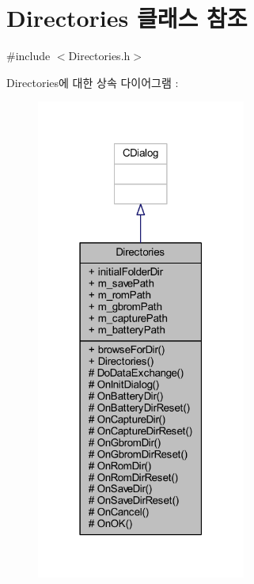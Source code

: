 \hypertarget{class_directories}{}\section{Directories 클래스 참조}
\label{class_directories}


{\ttfamily \#include $<$Directories.\+h$>$}



Directories에 대한 상속 다이어그램 \+: \nopagebreak
\begin{figure}[H]
\begin{center}
\leavevmode
\includegraphics[width=195pt]{class_directories__inherit__graph}
\end{center}
\end{figure}


